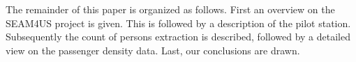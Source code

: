 The remainder of this paper is organized as follows. 
First an overview on the SEAM4US project is given. 
This is followed by a description of the pilot station. 
Subsequently the count of persons extraction is described, followed by a detailed view on the passenger density data. 
Last, our conclusions are drawn.


%
